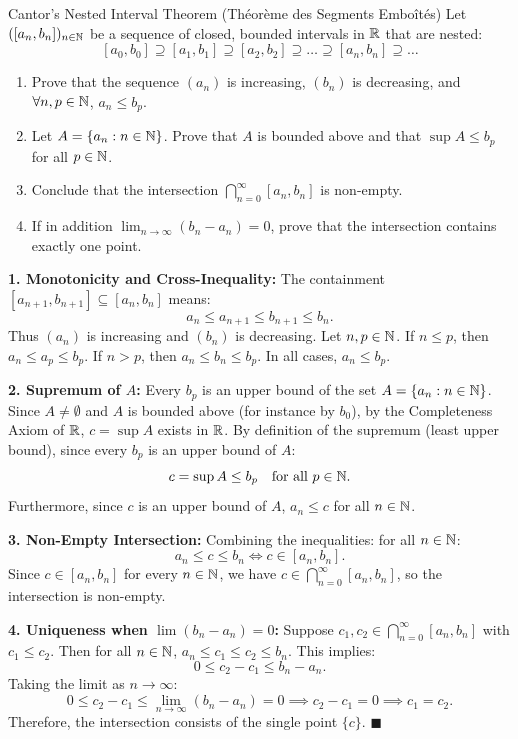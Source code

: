 \begin{exercise}{Cantor's Nested Interval Theorem (Théorème des Segments Emboîtés)}
Let $([a_n, b_n])_{n \in \mathbb{N}}$ be a sequence of closed, bounded intervals in $\mathbb{R}$ that are nested:
\[
[a_0, b_0] \supseteq [a_1, b_1] \supseteq [a_2, b_2] \supseteq \dots \supseteq [a_n, b_n] \supseteq \dots
\]
\begin{enumerate}[leftmargin=1.5em,itemsep=2pt]
  \item Prove that the sequence $(a_n)$ is increasing, $(b_n)$ is decreasing, and $\forall n, p \in \mathbb{N}$, $a_n \le b_p$.
  \item Let $A = \{a_n : n \in \mathbb{N}\}$. Prove that $A$ is bounded above and that $\sup A \le b_p$ for all $p \in \mathbb{N}$.
  \item Conclude that the intersection $\bigcap_{n=0}^\infty [a_n, b_n]$ is non-empty.
  \item If in addition $\lim_{n \to \infty} (b_n - a_n) = 0$, prove that the intersection contains exactly one point.
\end{enumerate}
\end{exercise}

\begin{tabletworkspace}[5.5cm]
\end{tabletworkspace}

\begin{solution}
\textbf{1. Monotonicity and Cross-Inequality:}
The containment $[a_{n+1}, b_{n+1}] \subseteq [a_n, b_n]$ means:
\[
a_n \le a_{n+1} \le b_{n+1} \le b_n.
\]
Thus $(a_n)$ is increasing and $(b_n)$ is decreasing.
Let $n, p \in \mathbb{N}$. If $n \le p$, then $a_n \le a_p \le b_p$.
If $n > p$, then $a_n \le b_n \le b_p$.
In all cases, $a_n \le b_p$.

\textbf{2. Supremum of $A$:}
Every $b_p$ is an upper bound of the set $A = \{a_n : n \in \mathbb{N}\}$.
Since $A \ne \emptyset$ and $A$ is bounded above (for instance by $b_0$), by the Completeness Axiom of $\mathbb{R}$, $c = \sup A$ exists in $\mathbb{R}$.
By definition of the supremum (least upper bound), since every $b_p$ is an upper bound of $A$:
\[
c = \sup A \le b_p \quad \text{for all } p \in \mathbb{N}.
\]
Furthermore, since $c$ is an upper bound of $A$, $a_n \le c$ for all $n \in \mathbb{N}$.

\textbf{3. Non-Empty Intersection:}
Combining the inequalities: for all $n \in \mathbb{N}$:
\[
a_n \le c \le b_n \iff c \in [a_n, b_n].
\]
Since $c \in [a_n, b_n]$ for every $n \in \mathbb{N}$, we have $c \in \bigcap_{n=0}^\infty [a_n, b_n]$, so the intersection is non-empty.

\textbf{4. Uniqueness when $\lim (b_n - a_n) = 0$:}
Suppose $c_1, c_2 \in \bigcap_{n=0}^\infty [a_n, b_n]$ with $c_1 \le c_2$.
Then for all $n \in \mathbb{N}$, $a_n \le c_1 \le c_2 \le b_n$.
This implies:
\[
0 \le c_2 - c_1 \le b_n - a_n.
\]
Taking the limit as $n \to \infty$:
\[
0 \le c_2 - c_1 \le \lim_{n \to \infty} (b_n - a_n) = 0 \implies c_2 - c_1 = 0 \implies c_1 = c_2.
\]
Therefore, the intersection consists of the single point $\{c\}$. \hfill $\blacksquare$
\end{solution}


